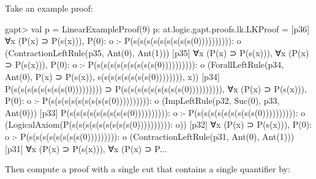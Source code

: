 \documentclass[a4paper,11pt]{article}
\begin{document}
Take an example proof:
\begin{clilisting}
gapt> val p = LinearExampleProof(9)
p: at.logic.gapt.proofs.lk.LKProof =
[p36] ∀x (P(x) ⊃ P(s(x))), P(0): o :- P(s(s(s(s(s(s(s(s(s(0)))))))))): o    (ContractionLeftRule(p35, Ant(0), Ant(1)))
[p35] ∀x (P(x) ⊃ P(s(x))),
∀x (P(x) ⊃ P(s(x))),
P(0): o
:-
P(s(s(s(s(s(s(s(s(s(0)))))))))): o    (ForallLeftRule(p34, Ant(0), P(x) ⊃ P(s(x)), s(s(s(s(s(s(s(s(0)))))))), x))
[p34] P(s(s(s(s(s(s(s(s(0))))))))) ⊃ P(s(s(s(s(s(s(s(s(s(0)))))))))),
∀x (P(x) ⊃ P(s(x))),
P(0): o
:-
P(s(s(s(s(s(s(s(s(s(0)))))))))): o    (ImpLeftRule(p32, Suc(0), p33, Ant(0)))
[p33] P(s(s(s(s(s(s(s(s(s(0)))))))))): o :- P(s(s(s(s(s(s(s(s(s(0)))))))))): o    (LogicalAxiom(P(s(s(s(s(s(s(s(s(s(0)))))))))): o))
[p32] ∀x (P(x) ⊃ P(s(x))), P(0): o :- P(s(s(s(s(s(s(s(s(0))))))))): o    (ContractionLeftRule(p31, Ant(0), Ant(1)))
[p31] ∀x (P(x) ⊃ P(s(x))),
∀x (P(x) ⊃ P...
\end{clilisting}
Then compute a proof with a single cut that contains a single quantifier by:
\end{document}
